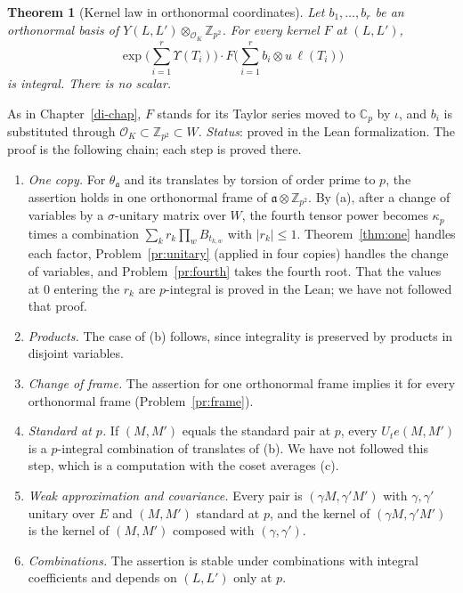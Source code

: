 \documentclass[reqno]{amsart}
\newcounter{chap}
\theoremstyle{definition}
\theoremstyle{plain}
\newtheorem{theorem}{Theorem}[section]
\theoremstyle{remark}
\newcommand{\Z}{\mathbb Z}
\newcommand{\C}{\mathbb C}
\newcommand{\Oc}{\mathcal O}
\begin{document}
\begin{theorem}[Kernel law in orthonormal coordinates]\label{thm:A}
Let \(b_1,\dots,b_r\) be an orthonormal basis of \(Y(L,L')\otimes_{\Oc_K}\Z_{p^2}\).  For every kernel \(F\) at \((L,L')\),
\[
 \exp\Big(\sum_{i=1}^r\Upsilon(T_i)\Big)\cdot F\Big(\sum_{i=1}^rb_i\otimes u\,\ell(T_i)\Big)
\]
is integral.  There is no scalar.
\end{theorem}
\noindent As in Chapter~\ref{di-chap}, \(F\) stands for its Taylor series moved to \(\C_p\) by \(\iota\), and \(b_i\) is substituted through \(\Oc_K\subset\Z_{p^2}\subset W\).
\noindent\emph{Status}: proved in the Lean formalization.  The proof is the following chain; each step is proved there.
\begin{enumerate}
\item[(1)] \emph{One copy.}  For \(\theta_{\mathfrak a}\) and its translates by torsion of order prime to \(p\), the assertion holds in one orthonormal frame of \(\mathfrak a\otimes\Z_{p^2}\).  By (a), after a change of variables by a \(\sigma\)-unitary matrix over \(W\), the fourth tensor power becomes \(\kappa_p\) times a combination \(\sum_kr_k\prod_wB_{t_{k,w}}\) with \(\lvert r_k\rvert\le1\).  Theorem~\ref{thm:one} handles each factor, Problem~\ref{pr:unitary} (applied in four copies) handles the change of variables, and Problem~\ref{pr:fourth} takes the fourth root.  That the values at \(0\) entering the \(r_k\) are \(p\)-integral is proved in the Lean; we have not followed that proof.
\item[(2)] \emph{Products.}  The case of (b) follows, since integrality is preserved by products in disjoint variables.
\item[(3)] \emph{Change of frame.}  The assertion for one orthonormal frame implies it for every orthonormal frame (Problem~\ref{pr:frame}).
\item[(4)] \emph{Standard at \(p\).}  If \((M,M')\) equals the standard pair at \(p\), every \(U_te(M,M')\) is a \(p\)-integral combination of translates of (b).  We have not followed this step, which is a computation with the coset averages (c).
\item[(5)] \emph{Weak approximation and covariance.}  Every pair is \((\gamma M,\gamma'M')\) with \(\gamma,\gamma'\) unitary over \(E\) and \((M,M')\) standard at \(p\), and the kernel of \((\gamma M,\gamma'M')\) is the kernel of \((M,M')\) composed with \((\gamma,\gamma')\).
\item[(6)] \emph{Combinations.}  The assertion is stable under combinations with integral coefficients and depends on \((L,L')\) only at \(p\).
\end{enumerate}
\end{document}
